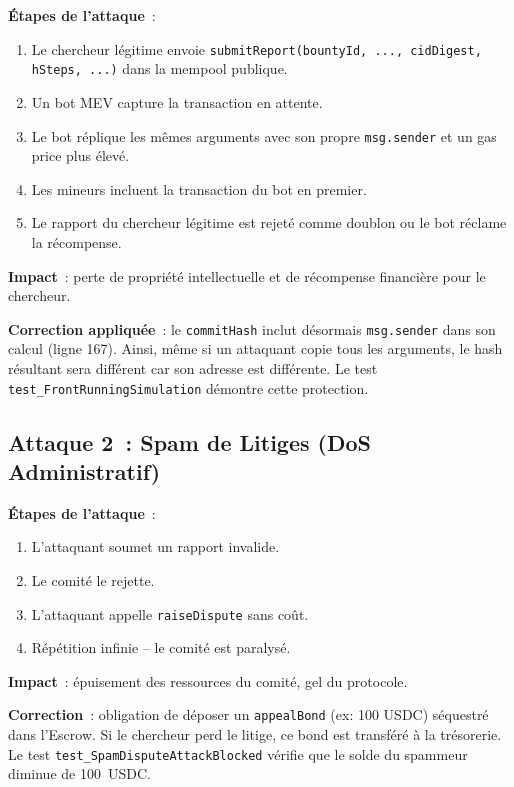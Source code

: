 \documentclass[12pt, a4paper]{report}
\begin{document}
\textbf{\'{E}tapes de l'attaque}~:
\begin{enumerate}
    \item Le chercheur l\'{e}gitime envoie \texttt{submitReport(bountyId, ..., cidDigest, hSteps, ...)} dans la mempool publique.
    \item Un bot MEV capture la transaction en attente.
    \item Le bot r\'{e}plique les m\^{e}mes arguments avec son propre \texttt{msg.sender} et un gas price plus \'{e}lev\'{e}.
    \item Les mineurs incluent la transaction du bot en premier.
    \item Le rapport du chercheur l\'{e}gitime est rejet\'{e} comme doublon ou le bot r\'{e}clame la r\'{e}compense.
\end{enumerate}

\textbf{Impact}~: perte de propri\'{e}t\'{e} intellectuelle et de r\'{e}compense financi\`{e}re pour le chercheur.

\textbf{Correction appliqu\'{e}e}~: le \texttt{commitHash} inclut d\'{e}sormais \texttt{msg.sender} dans son calcul (ligne 167). Ainsi, m\^{e}me si un attaquant copie tous les arguments, le hash r\'{e}sultant sera diff\'{e}rent car son adresse est diff\'{e}rente. Le test \texttt{test\_FrontRunningSimulation} d\'{e}montre cette protection.

\subsection{Attaque 2~: Spam de Litiges (DoS Administratif)}
\textbf{\'{E}tapes de l'attaque}~:
\begin{enumerate}
    \item L'attaquant soumet un rapport invalide.
    \item Le comit\'{e} le rejette.
    \item L'attaquant appelle \texttt{raiseDispute} sans co\^{u}t.
    \item R\'{e}p\'{e}tition infinie -- le comit\'{e} est paralys\'{e}.
\end{enumerate}

\textbf{Impact}~: \'{e}puisement des ressources du comit\'{e}, gel du protocole.

\textbf{Correction}~: obligation de d\'{e}poser un \texttt{appealBond} (ex: 100 USDC) s\'{e}questr\'{e} dans l'Escrow. Si le chercheur perd le litige, ce bond est transf\'{e}r\'{e} \`{a} la tr\'{e}sorerie. Le test \texttt{test\_SpamDisputeAttackBlocked} v\'{e}rifie que le solde du spammeur diminue de 100~USDC.
\end{document}
